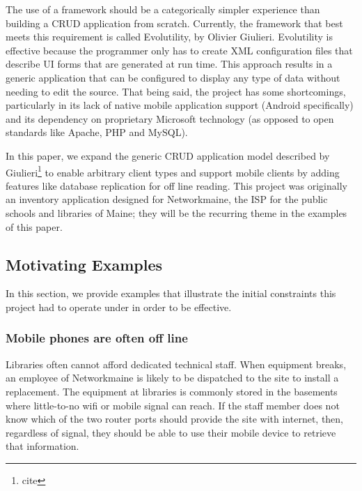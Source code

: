 \documentclass[journal]{IEEEtran}
\begin{document}
The use of a framework should be a categorically simpler experience than building a CRUD application from scratch. Currently, the framework that best meets this requirement is called Evolutility, by Olivier Giulieri. Evolutility is effective because the programmer only has to create XML configuration files that describe UI forms that are generated at run time. This approach results in a generic application that can be configured to display any type of data without needing to edit the source. That being said, the project has some shortcomings, particularly in its lack of native mobile application support (Android specifically) and its dependency on proprietary Microsoft technology (as opposed to open standards like Apache, PHP and MySQL). 

In this paper, we expand the generic CRUD application model described by Giulieri\footnote{cite} to enable arbitrary client types and support mobile clients by adding features like database replication for off line reading. This project was originally an inventory application designed for Networkmaine, the ISP for the public schools and libraries of Maine; they will be the recurring theme in the examples of this paper. 


\subsection{Motivating Examples} \label{sec:motivation}

In this section, we provide examples that illustrate the initial constraints this project had to operate under in order to be effective. 

\subsubsection{Mobile phones are often off line}  \label{sec:offline}

Libraries often cannot afford dedicated technical staff. When equipment breaks, an employee of Networkmaine is likely to be dispatched to the site to install a replacement. The equipment at libraries is commonly stored in the basements where little-to-no wifi or mobile signal can reach. If the staff member does not know which of the two router ports should provide the site with internet, then, regardless of signal, they should be able to use their mobile device to retrieve that information.
\end{document}
